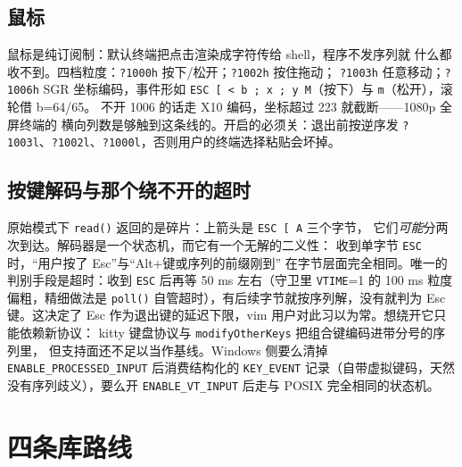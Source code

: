 \documentclass[12pt,a4paper,fontset=fandol]{ctexbook}
\newcommand{\Fn}[1]{\texttt{#1()}}
\newcommand{\Tp}[1]{\texttt{#1}}
\newcommand{\Bk}{\allowbreak}
\begin{document}
\subsection{鼠标}

鼠标是纯订阅制：默认终端把点击渲染成字符传给 shell，程序不发序列就
什么都收不到。四档粒度：\Tp{?1000h} 按下/松开；\Tp{?1002h} 按住拖动；
\Tp{?1003h} 任意移动；\Tp{?1006h} SGR 坐标编码，事件形如
\Tp{ESC [ < b ; x ; y M}（按下）与 \Tp{m}（松开），滚轮借 b=64/65。
不开 1006 的话走 X10 编码，坐标超过 223 就截断——1080p 全屏终端的
横向列数是够触到这条线的。开启的必须关：退出前按逆序发
\Tp{?1003l}、\Tp{?1002l}、\Tp{?1000l}，否则用户的终端选择粘贴会坏掉。

\subsection{按键解码与那个绕不开的超时}

原始模式下 \Fn{read} 返回的是碎片：上箭头是 \Tp{ESC [ A} 三个字节，
它们\emph{可能}分两次到达。解码器是一个状态机，而它有一个无解的二义性：
收到单字节 \Tp{ESC} 时，``用户按了 Esc''与``Alt+键或序列的前缀刚到''
在字节层面完全相同。唯一的判别手段是超时：收到 \Tp{ESC} 后再等 50 ms
左右（守卫里 \Tp{VTIME}=1 的 100 ms 粒度偏粗，精细做法是 \Fn{poll}
自管超时），有后续字节就按序列解，没有就判为 Esc 键。这决定了 Esc
作为退出键的延迟下限，vim 用户对此习以为常。想绕开它只能依赖新协议：
kitty 键盘协议与 \Tp{modifyOtherKeys} 把组合键编码进带分号的序列里，
但支持面还不足以当作基线。Windows 侧要么清掉
\Tp{ENABLE\Bk \_PROCESSED\Bk \_INPUT} 后消费结构化的
\Tp{KEY\_EVENT} 记录（自带虚拟键码，天然没有序列歧义），要么开
\Tp{ENABLE\Bk \_VT\Bk \_INPUT} 后走与 POSIX 完全相同的状态机。

\section{四条库路线}
\end{document}
